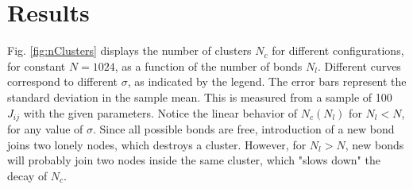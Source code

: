 \section{Results}

%
%
%


Fig. \ref{fig:nClusters} displays the number of clusters $N_c$ for different configurations, for constant $N=1024$, as a function of the number of bonds $N_l.$ Different curves correspond to different  $\sigma$, as indicated by the legend. The error bars represent the standard deviation in the sample mean. This is measured from a sample of 100 $J_{ij}$  with the given parameters. Notice the linear behavior of $N_c(N_l)$ for  $N_l < N$, for any value of $\sigma$. Since all possible bonds are free, introduction of a new bond joins two lonely nodes, which destroys a cluster. However, for  $N_l>N$, new bonds will probably join two nodes inside the same cluster, which "slows down" the decay of $N_c.$

